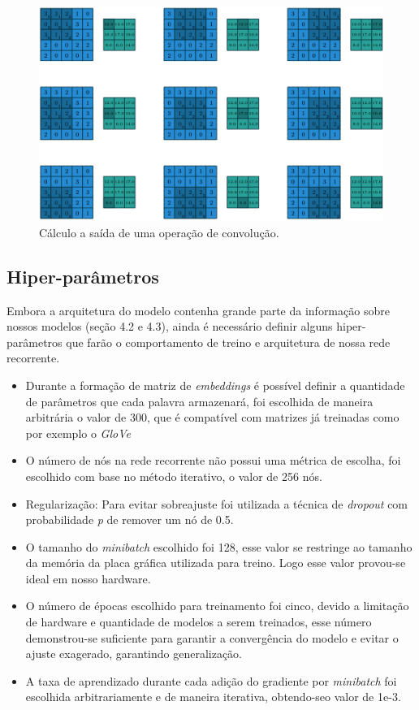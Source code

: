 \documentclass[12pt]{article}
\begin{document}
\begin{figure}[!htb]
\centering
\includegraphics[width=.9\textwidth]{images/convolutions.png}
\caption{Cálculo a saída de uma operação de convolução. \cite{dumoulin2016guide}}
\label{fig:graph}
\end{figure}

\subsection{Hiper-parâmetros}

Embora a arquitetura do modelo contenha grande parte da informação sobre nossos modelos (seção 4.2 e 4.3), ainda é necessário definir alguns hiper-parâmetros que farão o comportamento de treino e arquitetura de nossa rede recorrente.

\begin{itemize}
  \item Durante a formação de matriz de \textit{embeddings} é possível definir a quantidade de parâmetros que cada palavra armazenará, foi escolhida de maneira arbitrária o valor de 300, que é compatível com matrizes já treinadas como por exemplo o \textit{GloVe} \cite{pennington2014glove}\\
  \item O número de nós na rede recorrente não possui uma métrica de escolha, foi escolhido com base no método iterativo, o valor de 256 nós.\\
  \item Regularização: Para evitar sobreajuste foi utilizada a técnica de \textit{dropout} com probabilidade \textit{p} de remover um nó de 0.5.\\
  \item O tamanho do \textit{minibatch} escolhido foi 128, esse valor se restringe ao tamanho da memória da placa gráfica utilizada para treino. Logo esse valor provou-se ideal em nosso hardware.\\
  \item O número de épocas escolhido para treinamento foi cinco, devido a limitação de hardware e quantidade de modelos a serem treinados, esse número demonstrou-se suficiente para garantir a convergência do modelo e evitar o ajuste exagerado, garantindo generalização.\\
  \item A taxa de aprendizado durante cada adição do gradiente por \textit{minibatch} foi escolhida arbitrariamente e de maneira iterativa, obtendo-seo valor de 1e-3.
\end{itemize}
\end{document}
